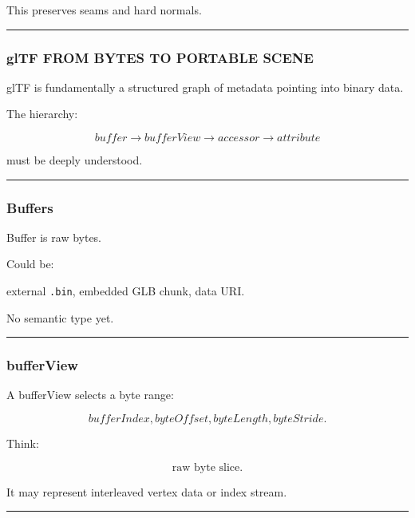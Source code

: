 This preserves seams and hard normals.

\begin{center}\rule{0.5\linewidth}{0.5pt}\end{center}

\subsubsection{glTF FROM BYTES TO PORTABLE SCENE}\label{gltf-from-bytes-to-portable-scene}

glTF is fundamentally a structured graph of metadata pointing into binary data.

The hierarchy:

\[
\boxed{
buffer
\rightarrow
bufferView
\rightarrow
accessor
\rightarrow
attribute
}
\]

must be deeply understood.

\begin{center}\rule{0.5\linewidth}{0.5pt}\end{center}

\subsubsection{Buffers}\label{buffers}

Buffer is raw bytes.

Could be:

external \texttt{.bin}, embedded GLB chunk, data URI.

No semantic type yet.

\begin{center}\rule{0.5\linewidth}{0.5pt}\end{center}

\subsubsection{bufferView}\label{bufferview}

A bufferView selects a byte range:

\[
bufferIndex,
byteOffset,
byteLength,
byteStride.
\]

Think:

\[
\boxed{
\text{raw byte slice}.
}
\]

It may represent interleaved vertex data or index stream.

\begin{center}\rule{0.5\linewidth}{0.5pt}\end{center}


